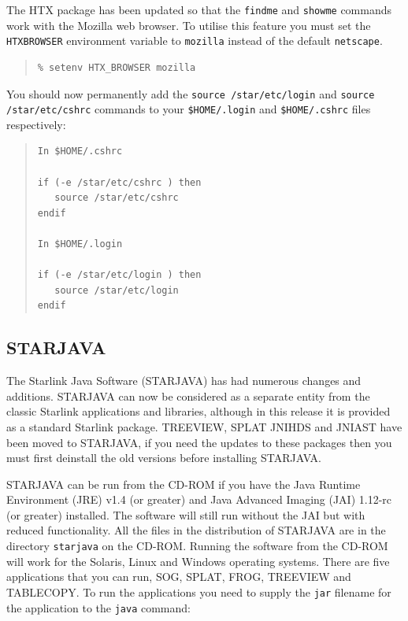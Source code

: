 \documentclass[twoside,11pt]{article}
\newcommand{\xlabel}[1]{}
\renewcommand{\_}{\texttt{\symbol{95}}}
\begin{document}
The HTX package has been updated so that the \texttt{findme} and
\texttt{showme} commands work with the Mozilla web browser. To utilise this
feature you must set the \texttt{HTX\_BROWSER} environment variable to
\texttt{mozilla} instead of the default \texttt{netscape}.

\begin{quote}
\begin{verbatim}
% setenv HTX_BROWSER mozilla
\end{verbatim}
\end{quote}

You should now permanently add the \texttt{source /star/etc/login} and 
\texttt{source /star/etc/cshrc} commands to your \texttt{\$HOME/.login}
and \texttt{\$HOME/.cshrc} files respectively:

\begin{quote}
\begin{verbatim}
In $HOME/.cshrc

if (-e /star/etc/cshrc ) then
   source /star/etc/cshrc
endif

In $HOME/.login

if (-e /star/etc/login ) then
   source /star/etc/login
endif
\end{verbatim}
\end{quote}

\subsection{\xlabel{star-java}STARJAVA}

The Starlink Java Software (STARJAVA) has had numerous changes and
additions. STARJAVA can now be considered as a separate entity from
the classic Starlink applications and libraries, although in this
release it is provided as a standard Starlink package. TREEVIEW, SPLAT
JNIHDS and JNIAST have been moved to STARJAVA, if you need the updates to
these packages then you must first deinstall the old versions before 
installing STARJAVA. 

STARJAVA can be run from the CD-ROM if you have the Java Runtime 
Environment (JRE) v1.4 (or greater) and Java Advanced Imaging (JAI)
1.1\_2-rc (or greater) installed. The software will still run without 
the JAI but with reduced functionality. All the files in the distribution 
of STARJAVA are in the directory \texttt{starjava} on the CD-ROM.
Running the software from the CD-ROM will work for the Solaris, Linux
and Windows operating systems. There are five applications
that you can run, SOG, SPLAT, FROG, TREEVIEW and TABLECOPY. To run
the applications you need to supply the \texttt{jar} filename for
the application to the \texttt{java} command: 
\end{document}
